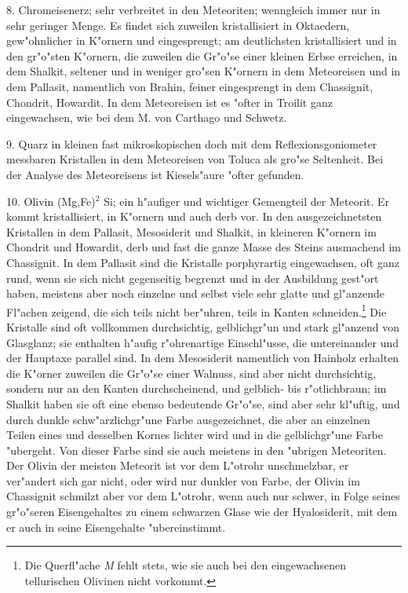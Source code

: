 \documentclass[a4paper, 11pt, oneside]{article}
\begin{document}
8. Chromeisenerz; sehr verbreitet in den Meteoriten; wenngleich immer nur in sehr geringer Menge. Es findet sich zuweilen kristallisiert in Oktaedern, gew"ohnlicher in K"ornern und eingesprengt; am deutlichsten kristallisiert und in den gr"o"sten K"ornern, die zuweilen die Gr"o"se einer kleinen Erbse erreichen, in dem Shalkit, seltener und in weniger gro"sen K"ornern in dem Meteoreisen und in dem Pallasit, namentlich von Brahin, feiner eingesprengt in dem Chassignit, Chondrit, Howardit. In dem Meteoreisen ist es "ofter in Troilit ganz eingewachsen, wie bei dem M. von Carthago und Schwetz.

9. Quarz in kleinen fast mikroskopischen doch mit dem Reflexionsgoniometer messbaren Kristallen in dem Meteoreisen von Toluca als gro"se Seltenheit. Bei der Analyse des Meteoreisens ist Kiesels"aure "ofter gefunden.

10. Olivin (Mg,Fe)$^{2}$ Si; ein h"aufiger und wichtiger Gemengteil der Meteorit. Er kommt kristallisiert, in K"ornern und auch derb vor. In den ausgezeichnetsten Kristallen in dem Pallasit, Mesosiderit und Shalkit, in kleineren K"ornern im Chondrit und Howardit, derb und fast die ganze Masse des Steins ausmachend im Chassignit. In dem Pallasit sind die Kristalle porphyrartig eingewachsen, oft ganz rund, wenn sie sich nicht gegenseitig begrenzt und in der Ausbildung gest"ort haben, meistens aber noch einzelne und selbst viele sehr glatte und gl"anzende Fl"achen zeigend, die sich teils nicht ber"uhren, teils in Kanten schneiden.\footnote{Die Querfl"ache \emph{M} fehlt stets, wie sie auch bei den eingewachsenen tellurischen Olivinen nicht vorkommt.} Die Kristalle sind oft vollkommen durchsichtig, gelblichgr"un und stark gl"anzend von Glasglanz; sie enthalten h"aufig r"ohrenartige Einschl"usse, die untereinander und der Hauptaxe parallel sind. In dem Mesosiderit namentlich von Hainholz erhalten die K"orner zuweilen die Gr"o"se einer Walnuss, sind aber nicht durchsichtig, sondern nur an den Kanten durchscheinend, und gelblich- bis r"otlichbraun; im Shalkit haben sie oft eine ebenso bedeutende Gr"o"se, sind aber sehr kl"uftig, und durch dunkle schw"arzlichgr"une Farbe ausgezeichnet, die aber an einzelnen Teilen eines und desselben Kornes lichter wird und in die gelblichgr"une Farbe "ubergeht. Von dieser Farbe sind sie auch meistens in den "ubrigen Meteoriten. Der Olivin der meisten Meteorit ist vor dem L"otrohr unschmelzbar, er ver"andert sich gar nicht, oder wird nur dunkler von Farbe, der Olivin im Chassignit schmilzt aber vor dem L"otrohr, wenn auch nur schwer, in Folge seines gr"o"seren Eisengehaltes zu einem schwarzen Glase wie der Hyalosiderit, mit dem er auch in seine Eisengehalte "ubereinstimmt.
\end{document}
